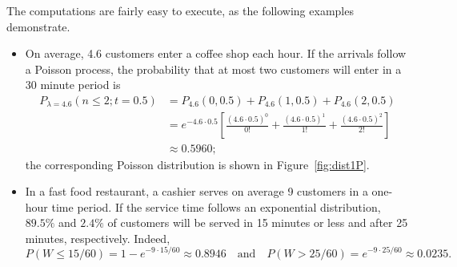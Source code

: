The computations are fairly easy to execute, as the following examples demonstrate.
\begin{itemize}
\item On average, 4.6 customers enter a coffee shop each hour. If the arrivals follow a Poisson process, the probability that at most two customers will enter in a 30 minute period is \begin{align*}P_{\lambda=4.6}(n\leq 2;t=0.5)&=P_{4.6}(0,0.5)+P_{4.6}(1,0.5)+P_{4.6}(2,0.5) \\ &=e^{-4.6\cdot 0.5}\left[\frac{(4.6\cdot 0.5)^0}{0!}+\frac{(4.6\cdot 0.5)^1}{1!}+\frac{(4.6\cdot 0.5)^2}{2!}\right] \\ &\approx 0.5960; \end{align*} the corresponding Poisson distribution is shown in Figure~\ref{fig:dist1P}. 
\item In a fast food restaurant, a cashier serves on average 9 customers in a one-hour time period. If the service time follows an exponential distribution, $89.5\%$ and $2.4\%$ of customers will be served in 15 minutes or less and after 25 minutes, respectively. Indeed, $$P(W\leq 15/60)=1-e^{-9 \cdot 15/60} \approx 0.8946\quad\text{and}\quad P(W>25/60)=e^{-9\cdot 25/60}\approx 0.0235.$$	
\end{itemize}

